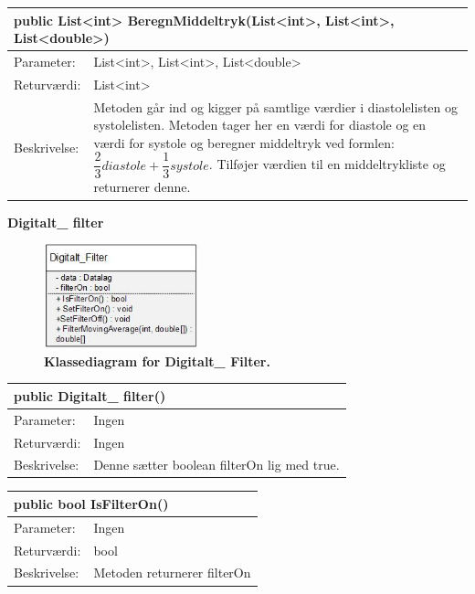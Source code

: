 \begin{table}[H]
\label{tab:tabel2}
\begin{tabular}{| l | p{13cm} |}
   \hline
   \multicolumn{2}{|l|}{public List<int> BeregnMiddeltryk(List<int>, List<int>, List<double>)} \\ \hline
   Parameter: & List<int>, List<int>, List<double>\\ \hline
   Returværdi: & List<int> \\ \hline
   Beskrivelse: & Metoden går ind og kigger på samtlige værdier i diastolelisten og systolelisten. Metoden tager  her en værdi for diastole og en værdi for systole og beregner middeltryk ved formlen: $\dfrac{2}{3}diastole+\dfrac{1}{3}systole$. Tilføjer værdien til en middeltrykliste og returnerer denne. \\ \hline
\end{tabular}
\end{table}
\textbf{Digitalt\_ filter}
\begin{figure}[H]
\includegraphics[width =0.4\textwidth , center]{billeder/klassediagramdigi}
\caption{\textbf{Klassediagram for Digitalt\_ Filter.}}
\end{figure}
\begin{table}[H]
\label{tab:tabel2}
\begin{tabular}{| l | p{13cm} |}
   \hline
   \multicolumn{2}{|l|}{public Digitalt\_ filter()} \\ \hline
   Parameter: & Ingen\\ \hline
   Returværdi: & Ingen \\ \hline
   Beskrivelse: & Denne sætter boolean filterOn lig med true. \\ \hline
\end{tabular}
\end{table}
\begin{table}[H]
\label{tab:tabel2}
\begin{tabular}{| l | p{13cm} |}
   \hline
   \multicolumn{2}{|l|}{public bool IsFilterOn()} \\ \hline
   Parameter: & Ingen\\ \hline
   Returværdi: & bool\\ \hline
   Beskrivelse: & Metoden returnerer filterOn\\ \hline
\end{tabular}
\end{table}
